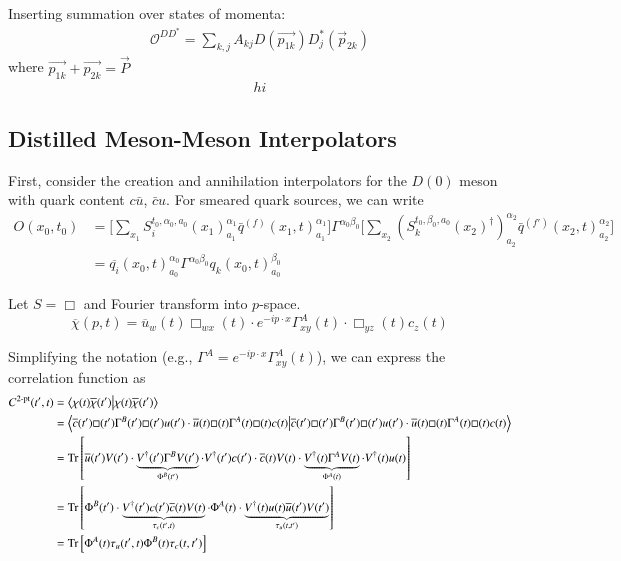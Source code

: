 \begin{table}
Inserting summation over states of momenta:
\begin{align}
    \mathcal{O}^{DD^*} = \sum_{k,j} A_{kj} D(\vec{p_{1k}})D_j^*(\vec{p}_{2k}) 
\end{align} where $\vec{p_{1k}} + \vec{p_{2k}} = \vec{P}$
\begin{align}
hi
\end{align}


\subsection{Distilled Meson-Meson Interpolators}

First, consider the creation and annihilation interpolators for the \(D(0)\) meson with quark content \(c\bar{u}\), \(\bar{c}u\). For smeared quark sources, we can write 
\begin{align}
    O(x_0,t_0) &= \Bigg[\sum_{x_1} S_i^{t_0,\alpha_0,a_0}(x_1)^{\alpha_1}_{a_1}\bar{q}^{(f)}(x_1,t)^{\alpha_1}_{a_1}\Bigg] \Gamma^{\alpha_0\beta_0} \Bigg[\sum_{x_2} (S_k^{t_0,\beta_0,a_0}(x_2)^\dagger)^{\alpha_2}_{a_2}\bar{q}^{(f')}(x_2,t)^{\alpha_2}_{a_2}\Bigg] \\
    &= \overline{q_i}(x_0, t)^{\alpha_0}_{a_0} \Gamma^{\alpha_0\beta_0} q_k(x_0,t)^{\beta_0}_{a_0}
\end{align}

Let \(S = \Box\) and Fourier transform into \(p\)-space. 
\[
\overline{\chi}(p, t) = \overline{u}_w(t) \Box_{wx}(t) \cdot e^{-ip\cdot x} \Gamma^A_{xy}(t) \cdot \Box_{yz}(t) c_z(t)
\]

Simplifying the notation (e.g., \(\Gamma^A = e^{-ip\cdot x} \Gamma^A_{xy}(t)\)), we can express the correlation function as 
\begin{align}
C^{2\text{-pt}}(t^\prime, t) &= \braket{\chi(t) \overline{\chi}(t^\prime)} \\
&= \braket{
\overline{c}(t^\prime) \Box(t^\prime) \Gamma^B(t^\prime) \Box(t^\prime) u(t^\prime) \cdot
\overline{u}(t) \Box(t) \Gamma^A(t) \Box(t) c(t)
} \\ 
&= \text{Tr}\left[
    \overline{u}(t^\prime) V(t^\prime) \cdot 
    \underbrace{V^\dagger(t^\prime) \Gamma^B V(t^\prime)}_{\Phi^B(t^\prime)} \cdot 
    V^\dagger(t^\prime) c(t^\prime) \cdot 
    \overline{c}(t) V(t) \cdot 
    \underbrace{V^\dagger(t) \Gamma^A V(t)}_{\Phi^A(t)} \cdot 
    V^\dagger(t) u(t)
\right] \\
&= \text{Tr} \left[\Phi^B(t^\prime) \cdot 
    \underbrace{V^\dagger(t^\prime) c(t^\prime) \overline{c}(t) V(t)}_{\tau_c(t^\prime, t)} \cdot 
    \Phi^A(t) \cdot 
    \underbrace{V^\dagger(t) u(t) \overline{u}(t^\prime) V(t^\prime)}_{\tau_u(t, t^\prime)}
\right] \\
&= \text{Tr}\left[\Phi^A(t) \tau_u(t^\prime, t) \Phi^B(t) \tau_c(t, t^\prime)\right]
\end{align}


\end{table}

